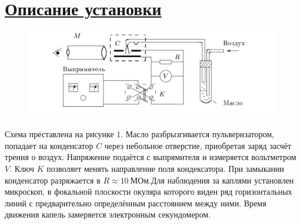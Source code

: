 \documentclass[a4paper,12pt]{article} %
\begin{document}
	\section*{\underline{\textbf{Описание установки}}}
	  \begin{figure}[h]
	\includegraphics[width=15cm]{1.png}
	\label{ris1}
	\caption{}
	\centering
\end{figure}
   Схема преставлена на рисунке 1. Масло разбрызгивается пульверизатором, попадает на конденсатор $C$ через небольное отверстие, приобретая заряд засчёт трения о воздух. Напряжение подаётся с выпрямителя и измеряется вольтметром $V$. Ключ $K$ позволяет менять направление поля кондексатора. При замыкании конденсатор разряжается в $R \approx 10~\text{МОм}$.Для наблюдения за каплями установлен микроскоп, в фокальной плоскости окуляра которого  виден ряд горизонтальных линий с предварительно определённым расстоянием между ними. Время движения капель замеряется электронным секундомером.
\end{document}
